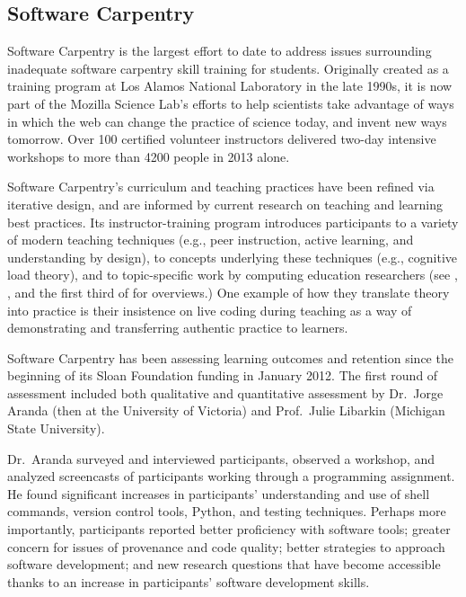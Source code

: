 \documentclass{proposalnsf}
\begin{document}
\subsection{Software Carpentry}
\label{sec:SC}

Software Carpentry \cite{swcsite,wilson2012} is the largest effort to
date to address issues surrounding inadequate software carpentry skill
training for students. Originally created as a training program at Los
Alamos National Laboratory in the late 1990s, it is now part of the
Mozilla Science Lab's efforts to help scientists take advantage of
ways in which the web can change the practice of science today, and
invent new ways tomorrow.  Over 100 certified volunteer instructors
delivered two-day intensive workshops to more than 4200 people in 2013
alone.

Software Carpentry's curriculum and teaching practices have been
refined via iterative design, and are informed by current research on
teaching and learning best practices.  Its instructor-training program
\cite{trainingsite} introduces participants to a variety of modern
teaching techniques (e.g., peer instruction, active learning, and
understanding by design), to concepts underlying these techniques
(e.g., cognitive load theory), and to topic-specific work by computing
education researchers (see \cite{guzdial2010}, \cite{hazzan2011}, and
the first third of \cite{sorva2012} for overviews.)  One example of
how they translate theory into practice is their insistence on live
coding during teaching as a way of demonstrating and transferring
authentic practice to learners.

Software Carpentry has been assessing learning outcomes and retention
since the beginning of its Sloan Foundation funding in January 2012.
The first round of assessment included both qualitative and
quantitative assessment by Dr.\ Jorge Aranda (then at the University
of Victoria) and Prof.\ Julie Libarkin (Michigan State University).

Dr.\ Aranda surveyed and interviewed participants, observed a
workshop, and analyzed screencasts of participants working through a
programming assignment. He found significant increases in
participants' understanding and use of shell commands, version control
tools, Python, and testing techniques. Perhaps more importantly,
participants reported better proficiency with software tools; greater
concern for issues of provenance and code quality; better strategies
to approach software development; and new research questions that have
become accessible thanks to an increase in participants' software
development skills.
\end{document}
